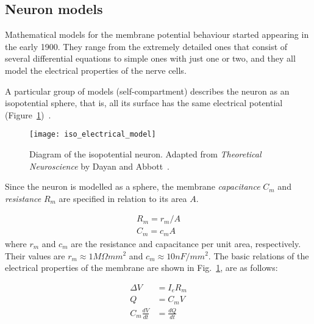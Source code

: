 \subsection{Neuron models}

Mathematical models for the membrane potential behaviour started appearing in the early 1900. They range from the extremely detailed ones that consist of several differential equations to simple ones with just one or two, and they all model the electrical properties of the nerve cells. 

A particular group of models (self-compartment) describes the neuron as an isopotential sphere, that is, all its surface has the same electrical potential (Figure~\ref{fig:neuro:isopotential})~\cite{dayan2001theoretical}.

\begin{figure}[hbt]
  \begin{center}
    \texttt{[image: iso\_electrical\_model]}
    \caption{Diagram of the isopotential neuron. Adapted from \emph{Theoretical Neuroscience} by Dayan and Abbott~\cite{dayan2001theoretical}.}
    \label{fig:neuro:isopotential}
  \end{center}
\end{figure}

Since the neuron is modelled as a sphere, the membrane \emph{capacitance} $C_{m}$ and \emph{resistance} $R_{m}$ are specified in relation to its area $A$.

\begin{align}
R_{m} = r_{m}/A \\
C_{m} = c_{m}A
\end{align}
where $r_{m}$ and $c_{m}$ are the resistance and capacitance per unit area, 
respectively. Their values are $r_{m} \approx 1M \Omega mm^{2}$ and $c_{m} 
\approx 10nF/mm^{2}$. The basic relations of the electrical properties of the membrane are shown in  
Fig.~\ref{fig:neuro:isopotential}, are as follows:

\begin{align}
\Delta V &= I_{e}R_{m} \label{eq:neuro:volt-shift}\\[0.5em]
Q &= C_{m}V \label{eq:neuro:charge} \\[0.5em]
C_{m}\frac{dV}{dt} &= \frac{dQ}{dt} \label{eq:neuro:cap-curr}
\end{align}

